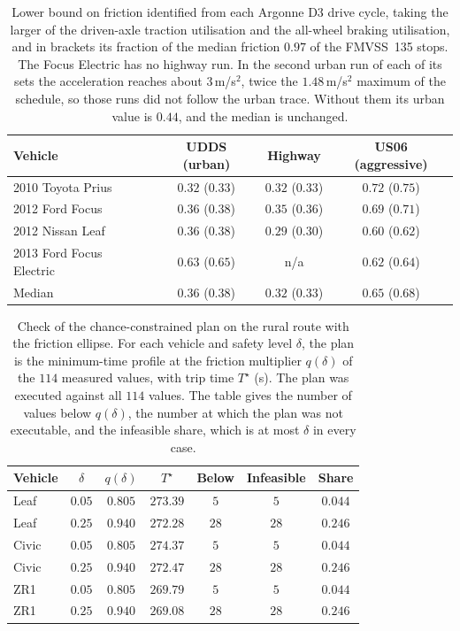 \begin{table}[htbp]
\centering\small
\caption{Lower bound on friction identified from each Argonne D3 drive cycle, taking the larger of the driven-axle traction utilisation and the all-wheel braking utilisation, and in brackets its fraction of the median friction $0.97$ of the FMVSS~135 stops. The Focus Electric has no highway run. In the second urban run of each of its sets the acceleration reaches about $3$\,m/s$^2$, twice the $1.48$\,m/s$^2$ maximum of the schedule, so those runs did not follow the urban trace. Without them its urban value is $0.44$, and the median is unchanged.}\label{tab:d3cycles}
\begin{tabular}{lccc}
\toprule
Vehicle & UDDS (urban) & Highway & US06 (aggressive)\\
\midrule
2010 Toyota Prius & $0.32$ ($0.33$) & $0.32$ ($0.33$) & $0.72$ ($0.75$)\\
2012 Ford Focus & $0.36$ ($0.38$) & $0.35$ ($0.36$) & $0.69$ ($0.71$)\\
2012 Nissan Leaf & $0.36$ ($0.38$) & $0.29$ ($0.30$) & $0.60$ ($0.62$)\\
2013 Ford Focus Electric & $0.63$ ($0.65$) & n/a & $0.62$ ($0.64$)\\
\midrule
Median & $0.36$ ($0.38$) & $0.32$ ($0.33$) & $0.65$ ($0.68$)\\
\bottomrule
\end{tabular}
\end{table}

\begin{table}[htbp]
\centering\small
\caption{Check of the chance-constrained plan on the rural route with the friction ellipse. For each vehicle and safety level $\delta$, the plan is the minimum-time profile at the friction multiplier $q(\delta)$ of the $114$ measured values, with trip time $T^\star$ (s). The plan was executed against all $114$ values. The table gives the number of values below $q(\delta)$, the number at which the plan was not executable, and the infeasible share, which is at most $\delta$ in every case.}\label{tab:app-chance}
\begin{tabular}{lcccccc}
\toprule
Vehicle & $\delta$ & $q(\delta)$ & $T^\star$ & Below & Infeasible & Share\\
\midrule
Leaf & $0.05$ & $0.805$ & $273.39$ & $5$ & $5$ & $0.044$\\
Leaf & $0.25$ & $0.940$ & $272.28$ & $28$ & $28$ & $0.246$\\
Civic & $0.05$ & $0.805$ & $274.37$ & $5$ & $5$ & $0.044$\\
Civic & $0.25$ & $0.940$ & $272.47$ & $28$ & $28$ & $0.246$\\
ZR1 & $0.05$ & $0.805$ & $269.79$ & $5$ & $5$ & $0.044$\\
ZR1 & $0.25$ & $0.940$ & $269.08$ & $28$ & $28$ & $0.246$\\
\bottomrule
\end{tabular}
\end{table}


